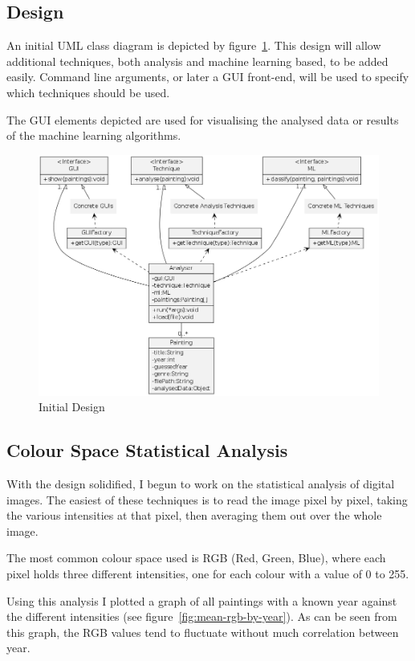 \documentclass[11pt,fleqn,twoside]{article}
\begin{document}
\subsection{Design}
An initial UML class diagram is depicted by figure~\ref{fig:init-class}. This design will allow 
additional techniques, both analysis and machine learning based, to be added easily. Command line
arguments, or later a GUI front-end, will be used to specify which techniques should be used.

The GUI elements depicted are used for visualising the analysed data or results of the machine
learning algorithms.

\begin{figure}[p]
\includegraphics[scale=0.5]{img/design.png}
\caption{Initial Design}
\label{fig:init-class}
\end{figure}

\subsection{Colour Space Statistical Analysis}
With the design solidified, I begun to work on the statistical analysis of digital images. The 
easiest of these techniques is to read the image pixel by pixel, taking the various intensities at
that pixel, then averaging them out over the whole image.

The most common colour space used is RGB (Red, Green, Blue), where each pixel holds three different
intensities, one for each colour with a value of 0 to 255.

Using this analysis I plotted a graph of all paintings with a known year against the different 
intensities (see figure~\ref{fig:mean-rgb-by-year}). As can be seen from this graph, the RGB values
tend to fluctuate without much correlation between year.
\end{document}
